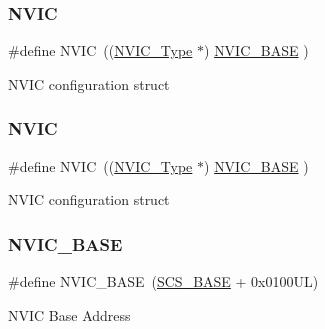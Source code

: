 \subsubsection{\texorpdfstring{NVIC}{NVIC}\hspace{0.1cm}{\footnotesize\ttfamily [11/12]}}
{\footnotesize\ttfamily \#define N\+V\+IC~((\mbox{\hyperlink{struct_n_v_i_c___type}{N\+V\+I\+C\+\_\+\+Type}}      $\ast$)     \mbox{\hyperlink{group___c_m_s_i_s__core__base_gaa0288691785a5f868238e0468b39523d}{N\+V\+I\+C\+\_\+\+B\+A\+SE}}        )}

N\+V\+IC configuration struct \mbox{\label{group___c_m_s_i_s__core__base_gac8e97e8ce56ae9f57da1363a937f8a17}} 
\subsubsection{\texorpdfstring{NVIC}{NVIC}\hspace{0.1cm}{\footnotesize\ttfamily [12/12]}}
{\footnotesize\ttfamily \#define N\+V\+IC~((\mbox{\hyperlink{struct_n_v_i_c___type}{N\+V\+I\+C\+\_\+\+Type}}      $\ast$)     \mbox{\hyperlink{group___c_m_s_i_s__core__base_gaa0288691785a5f868238e0468b39523d}{N\+V\+I\+C\+\_\+\+B\+A\+SE}}        )}

N\+V\+IC configuration struct \mbox{\label{group___c_m_s_i_s__core__base_gaa0288691785a5f868238e0468b39523d}} 
\subsubsection{\texorpdfstring{NVIC\_BASE}{NVIC\_BASE}\hspace{0.1cm}{\footnotesize\ttfamily [1/12]}}
{\footnotesize\ttfamily \#define N\+V\+I\+C\+\_\+\+B\+A\+SE~(\mbox{\hyperlink{group___c_m_s_i_s__core__base_ga3c14ed93192c8d9143322bbf77ebf770}{S\+C\+S\+\_\+\+B\+A\+SE}} +  0x0100\+U\+L)}

N\+V\+IC Base Address \mbox{\label{group___c_m_s_i_s__core__base_gaa0288691785a5f868238e0468b39523d}} 
